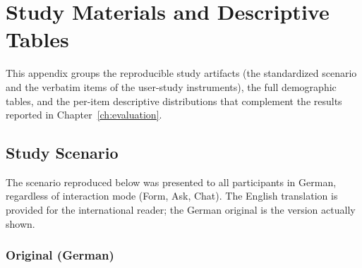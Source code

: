 \chapter{Study Materials and Descriptive Tables}
\label{app:materials-descriptives}

This appendix groups the reproducible study artifacts (the
standardized scenario and the verbatim items of the user-study
instruments), the full demographic tables, and the per-item
descriptive distributions that complement the results reported
in Chapter~\ref{ch:evaluation}.

\section{Study Scenario}
\label{app:scenario}

The scenario reproduced below was presented to all participants
in German, regardless of interaction mode (Form, Ask, Chat). The
English translation is provided for the international reader; the
German original is the version actually shown.

\subsection{Original (German)}
\label{app:scenario-de}

